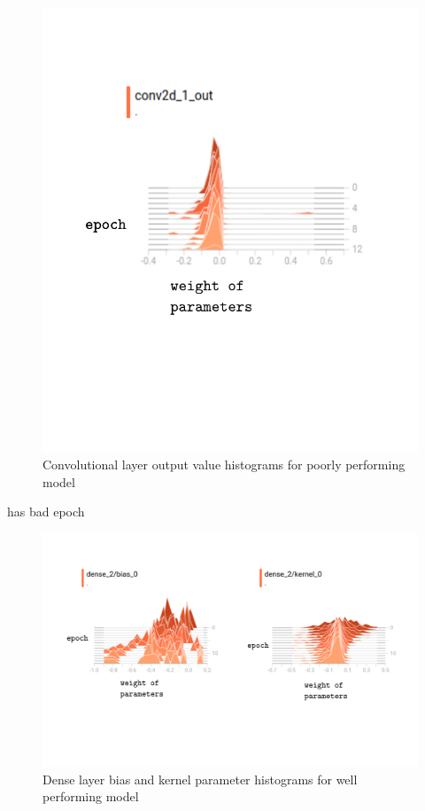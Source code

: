 \documentclass{article}
\begin{document}
\begin{figure}[h]
  \includegraphics[scale=0.8]{badearlyout.pdf}
  \caption{Convolutional layer output value histograms for poorly performing model}
  \label{fig:badearlyout}
\end{figure}
has bad epoch

\begin{figure}[h]
  \includegraphics[width=\linewidth]{gooddense.pdf}
  \caption{Dense layer bias and kernel parameter histograms for well performing model}
  \label{fig:gooddenseweights}
\end{figure}
\end{document}
